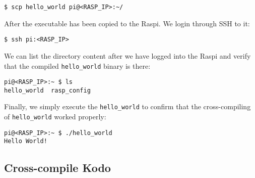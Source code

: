 \begin{lstlisting}[]
$ scp hello_world pi@<RASP_IP>:~/
\end{lstlisting}
\FloatBarrier
\vspace{-5mm}



After the executable has been copied to the \ac{Raspi}. We login through
\ac{SSH} to it:

\begin{lstlisting}[]
$ ssh pi:<RASP_IP>
\end{lstlisting}
\FloatBarrier
\vspace{-5mm}

We can list the directory content after we have logged into the \ac{Raspi} and
verify that the compiled \texttt{hello\_world} binary is there:

\begin{lstlisting}[]
pi@<RASP_IP>:~ $ ls
hello_world  rasp_config
\end{lstlisting}
\FloatBarrier
\vspace{-5mm}

Finally, we simply execute the \texttt{hello\_world} to confirm that
the cross-compiling of \texttt{hello\_world} worked properly:

\begin{lstlisting}[]
pi@<RASP_IP>:~ $ ./hello_world
Hello World!
\end{lstlisting}
\FloatBarrier
\vspace{-5mm}

\subsection{Cross-compile Kodo}

